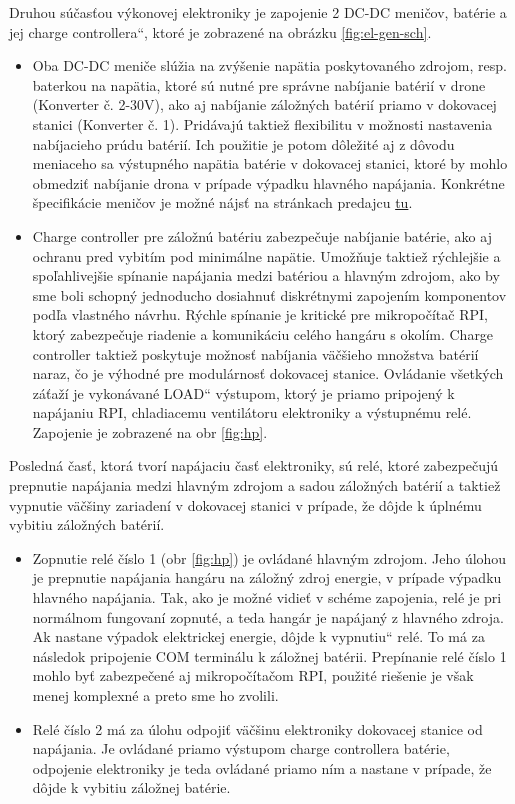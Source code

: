 \documentclass[a4paper]{article}
\newcommand\uvoz[1]{\quotedblbase #1\textquotedblleft}%
\begin{document}
        \noindent
        Druhou súčasťou výkonovej elektroniky je zapojenie 2 DC-DC meničov, batérie a jej \uvoz{charge controllera}, ktoré je zobrazené na obrázku \ref{fig:el-gen-sch}.
        \begin{itemize}
            \item Oba DC-DC meniče slúžia na zvýšenie napätia poskytovaného zdrojom, resp. baterkou na napätia, ktoré sú nutné pre správne nabíjanie batérií v drone (Konverter č. 2-30V), ako aj nabíjanie záložných batérií priamo v dokovacej stanici (Konverter č. 1). Pridávajú taktiež flexibilitu v možnosti nastavenia nabíjacieho prúdu batérií. Ich použitie je potom dôležité aj z dôvodu meniaceho sa výstupného napätia batérie v dokovacej stanici, ktoré by mohlo obmedziť nabíjanie drona v prípade výpadku hlavného napájania. Konkrétne špecifikácie meničov je možné nájsť na stránkach predajcu \href{https://www.t-led.cz/p/led-zdroj-12v-600w-slim-12v-600w-56135}{tu}.
            
            \item Charge controller pre záložnú batériu zabezpečuje nabíjanie batérie, ako aj ochranu pred vybitím pod minimálne napätie. Umožňuje taktiež rýchlejšie a spoľahlivejšie spínanie napájania medzi batériou a hlavným zdrojom, ako by sme boli schopný jednoducho dosiahnuť diskrétnymi zapojením komponentov podľa vlastného návrhu. Rýchle spínanie je kritické pre mikropočítač \acs{RPI}, ktorý zabezpečuje riadenie a komunikáciu celého hangáru s okolím. Charge controller taktiež poskytuje možnosť nabíjania väčšieho množstva batérií naraz, čo je výhodné pre modulárnosť dokovacej stanice. Ovládanie všetkých záťaží je vykonávané \uvoz{LOAD} výstupom, ktorý je priamo pripojený k napájaniu \acs{RPI}, chladiacemu ventilátoru elektroniky a výstupnému relé. Zapojenie je zobrazené na obr \ref{fig:hp}.
        \end{itemize}

        \noindent
        Posledná časť, ktorá tvorí napájaciu časť elektroniky, sú relé, ktoré zabezpečujú prepnutie napájania medzi hlavným zdrojom a sadou záložných batérií a taktiež vypnutie väčšiny zariadení v dokovacej stanici v prípade, že dôjde k úplnému vybitiu záložných batérií.
        \begin{itemize}
            \item Zopnutie relé číslo 1 (obr \ref{fig:hp}) je ovládané hlavným zdrojom. Jeho úlohou je prepnutie napájania hangáru na záložný zdroj energie, v prípade výpadku hlavného napájania. Tak, ako je možné vidieť v schéme zapojenia, relé je pri normálnom fungovaní zopnuté, a teda hangár je napájaný z hlavného zdroja. Ak nastane výpadok elektrickej energie, dôjde k \uvoz{vypnutiu} relé. To má za následok pripojenie COM terminálu k záložnej batérii. Prepínanie relé číslo 1 mohlo byť zabezpečené aj mikropočítačom RPI, použité riešenie je však menej komplexné a preto sme ho zvolili.
            \item Relé číslo 2 má za úlohu odpojiť väčšinu elektroniky dokovacej stanice od napájania. Je ovládané priamo výstupom charge controllera batérie, odpojenie elektroniky je teda ovládané priamo ním a nastane v prípade, že dôjde k vybitiu záložnej batérie. 
        \end{itemize}
\end{document}

